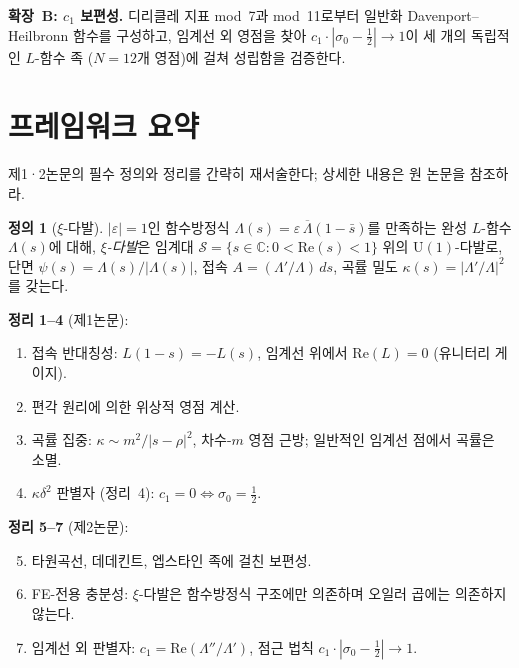 \documentclass[11pt, a4paper]{article}
\theoremstyle{plain}
\theoremstyle{definition}
\newtheorem{definition}{정의}[section]
\newcommand{\abs}[1]{\left|#1\right|}
\newcommand{\Lam}{\Lambda}             %
\newcommand{\kap}{\kappa}             %
\begin{document}
\textbf{확장~B: $c_{1}$ 보편성.}
디리클레 지표 mod~7과 mod~11로부터 일반화 Davenport--Heilbronn 함수를 구성하고,
임계선 외 영점을 찾아 $c_{1}\cdot\abs{\sigma_{0}-\tfrac{1}{2}} \to 1$이
세 개의 독립적인 $L$-함수 족 ($N=12$개 영점)에 걸쳐 성립함을 검증한다.


\section{프레임워크 요약}
\label{sec:recap}

제1·2논문의 필수 정의와 정리를 간략히 재서술한다;
상세한 내용은 원 논문을 참조하라.

\begin{definition}[$\xi$-다발]\label{def:bundle}
$\abs{\varepsilon}=1$인 함수방정식 $\Lam(s) = \varepsilon\,\overline{\Lam}(1-\bar{s})$를
만족하는 완성 $L$-함수 $\Lam(s)$에 대해, \emph{$\xi$-다발}은
임계대 $\mathcal{S} = \{s \in \mathbb{C} : 0<\mathrm{Re}(s)<1\}$ 위의
$\mathrm{U}(1)$-다발로, 단면 $\psi(s) = \Lam(s)/\abs{\Lam(s)}$,
접속 $A = (\Lam'/\Lam)\,ds$, 곡률 밀도 $\kap(s) = \abs{\Lam'/\Lam}^{2}$를
갖는다.
\end{definition}

\noindent\textbf{정리 1--4} (제1논문):
\begin{enumerate}
  \item 접속 반대칭성: $L(1-s) = -L(s)$, 임계선 위에서 $\mathrm{Re}(L)=0$ (유니터리 게이지).
  \item 편각 원리에 의한 위상적 영점 계산.
  \item 곡률 집중: $\kap \sim m^{2}/\abs{s-\rho}^{2}$, 차수-$m$ 영점 근방;
    일반적인 임계선 점에서 곡률은 소멸.
  \item $\kap\delta^{2}$ 판별자 (정리~4): $c_{1}=0 \iff \sigma_{0}=\tfrac{1}{2}$.
\end{enumerate}

\noindent\textbf{정리 5--7} (제2논문):
\begin{enumerate}\setcounter{enumi}{4}
  \item 타원곡선, 데데킨트, 엡스타인 족에 걸친 보편성.
  \item FE-전용 충분성: $\xi$-다발은 함수방정식 구조에만 의존하며 오일러 곱에는 의존하지 않는다.
  \item 임계선 외 판별자: $c_{1} = \mathrm{Re}(\Lam''/\Lam')$, 점근 법칙
    $c_{1}\cdot\abs{\sigma_{0}-\tfrac{1}{2}} \to 1$.
\end{enumerate}
\end{document}
